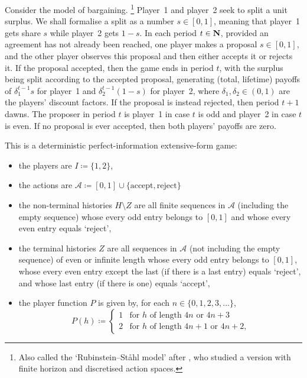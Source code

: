\begin{example}
	\label{example:rubinstein}
	Consider the \textcite{Rubinstein1982} model of bargaining.%
		\footnote{Also called the `Rubinstein--Ståhl model' after \textcite{Stahl1972,Stahl1977}, who studied a version with finite horizon and discretised action spaces.}
	Player~1 and player~2 seek to split a unit surplus. We shall formalise a split as a number $s \in [0,1]$, meaning that player~1 gets share $s$ while player~2 gets $1-s$. In each period $t \in \mathbf{N}$, provided an agreement has not already been reached, one player makes a proposal $s \in [0,1]$, and the other player observes this proposal and then either accepts it or rejects it. If the proposal accepted, then the game ends in period $t$, with the surplus being split according to the accepted proposal, generating (total, lifetime) payoffs of $\delta_1^{t-1} s$ for player~1 and $\delta_2^{t-1} (1-s)$ for player~2, where $\delta_1,\delta_2 \in (0,1)$ are the players' discount factors. If the proposal is instead rejected, then period $t+1$ dawns. The proposer in period $t$ is player~1 in case $t$ is odd and player~2 in case $t$ is even. If no proposal is ever accepted, then both players' payoffs are zero.

	This is a deterministic perfect-information extensive-form game:
	\begin{itemize}
	
		\item the players are $I \coloneqq \{1,2\}$,

		\item the actions are $\mathcal{A} \coloneqq [0,1] \cup \{\text{accept},\text{reject}\}$

		\item the non-terminal histories $H \setminus Z$ are all finite sequences in $\mathcal{A}$ (including the empty sequence) whose every odd entry belongs to $[0,1]$ and whose every even entry equals `reject',

		\item the terminal histories $Z$ are all sequences in $\mathcal{A}$ (not including the empty sequence) of even or infinite length whose every odd entry belongs to $[0,1]$, whose every even entry except the last (if there is a last entry) equals `reject', and whose last entry (if there is one) equals `accept',

		\item the player function $P$ is given by, for each $n \in \{0,1,2,3,\dots\}$, 
		\begin{equation*}
			P(h)
			\coloneqq
			\begin{cases}
				1 & \text{for $h$ of length $4n$ or $4n+3$} \\
				2 & \text{for $h$ of length $4n+1$ or $4n+2$,}
			\end{cases} 
		\end{equation*}


\end{itemize}
\end{example}
